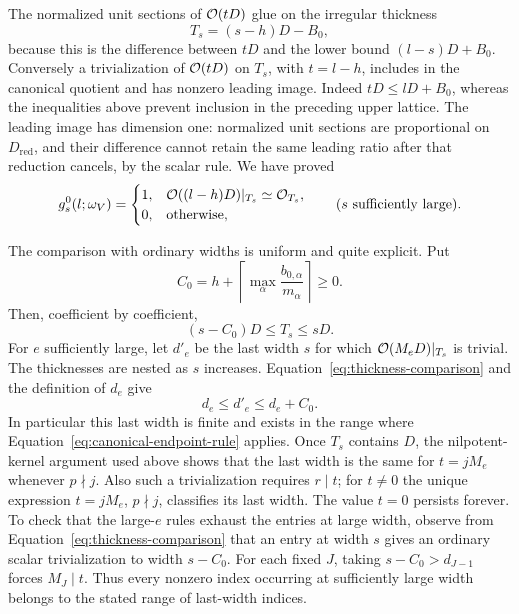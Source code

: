The normalized unit sections of $\mathcal O(tD)$ glue on the
irregular thickness
\begin{equation}\label{eq:irregular-thickness}
 T_s=(s-h)D-B_0,
\end{equation}
because this is the difference between $tD$ and the lower
bound $(l-s)D+B_0$. Conversely a trivialization of
$\mathcal O(tD)$ on $T_s$, with $t=l-h$, includes in the canonical
quotient and has nonzero leading image. Indeed $tD\leq
lD+B_0$, whereas the inequalities above prevent inclusion
in the preceding upper lattice. The leading image has
dimension one: normalized unit sections are proportional
on $D_{\mathrm{red}}$, and their difference cannot retain
the same leading ratio after that reduction cancels, by the
scalar rule. We have proved
\begin{equation}\label{eq:canonical-endpoint-rule}
 g_s^0(l;\omega_V)=
 \begin{cases}
 1,&\mathcal O((l-h)D)|_{T_s}\simeq\mathcal O_{T_s},\\
 0,&\text{otherwise},
 \end{cases}
 \qquad(s\text{ sufficiently large}).
\end{equation}

The comparison with ordinary widths is uniform and quite
explicit. Put
\[
 C_0=h+\left\lceil\max_\alpha
                    \frac{b_{0,\alpha}}{m_\alpha}\right\rceil
 \geq0.
\]
Then, coefficient by coefficient,
\begin{equation}\label{eq:thickness-comparison}
 (s-C_0)D\leq T_s\leq sD.
\end{equation}
For $e$ sufficiently large, let $d'_e$ be the last width
$s$ for which $\mathcal O(M_eD)|_{T_s}$ is trivial. The thicknesses
are nested as $s$ increases. Equation~\ref{eq:thickness-comparison}
and the definition of $d_e$ give
\begin{equation}\label{eq:canonical-width-comparison}
 d_e\leq d'_e\leq d_e+C_0.
\end{equation}
In particular this last width is finite and exists in the
range where Equation~\ref{eq:canonical-endpoint-rule}
applies. Once $T_s$ contains $D$, the nilpotent-kernel
argument used above shows that the last width is the same
for $t=jM_e$ whenever $p\nmid j$. Also such a trivialization
requires $r\mid t$; for $t\ne0$ the unique expression
$t=jM_e$, $p\nmid j$, classifies its last width. The value
$t=0$ persists forever. To check that the large-$e$ rules
exhaust the entries at large width, observe from
Equation~\ref{eq:thickness-comparison} that an entry at
width $s$ gives an ordinary scalar trivialization to width
$s-C_0$. For each fixed $J$, taking $s-C_0>d_{J-1}$
forces $M_J\mid t$. Thus every nonzero index occurring at
sufficiently large width belongs to the stated range of
last-width indices.


